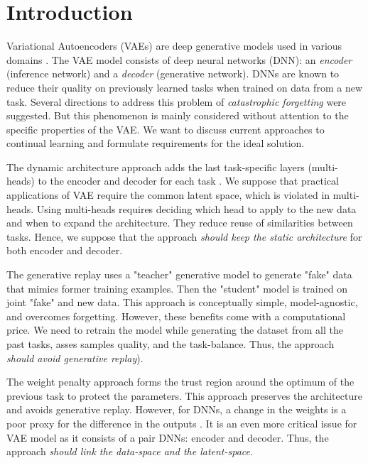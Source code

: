 \newpage
\section{Introduction}
\label{intro}
Variational Autoencoders (VAEs) \citep{kingma2014autoencoding} are deep generative models used in various domains \citep{lee2017augmented, zhou2020unsupervised}. The VAE model consists of deep neural networks (DNN): an \textit{encoder} (inference network) and a \textit{decoder} (generative network). DNNs are known to reduce their quality on previously learned tasks when trained on data from a new task. Several directions to address this problem of \textit{catastrophic forgetting} were suggested. But this phenomenon is mainly considered without attention to the specific properties of the VAE. We want to discuss current approaches to continual learning and formulate requirements for the ideal solution. 

The dynamic architecture approach adds the last task-specific layers (multi-heads) to the encoder and decoder for each task \citep{rusu2016progressive, nguyen2017variational, li2018learning}. We suppose that practical applications of VAE require the common latent space, which is violated in multi-heads. Using multi-heads requires deciding which head to apply to the new data and when to expand the architecture. They reduce reuse of similarities between tasks. Hence, we suppose that the approach \textit{should keep the static architecture} for both encoder and decoder.

The generative replay \citep{shin2017continual, rao2019continual} uses a "teacher" generative model to generate "fake" data that mimics former training examples. Then the "student" model is trained on joint "fake" and new data. This approach is conceptually simple, model-agnostic, and overcomes forgetting. However, these benefits come with a computational price. We need to retrain the model while generating the dataset from all the past tasks, asses samples quality, and the task-balance. Thus, the approach \textit{ should avoid generative replay}).

The weight penalty approach \citep{liu2018rotate, kirkpatrick2017overcoming} forms the trust region around the optimum of the previous task to protect the parameters. This approach preserves the architecture and avoids generative replay. However, for DNNs, a change in the weights is a poor proxy for the difference in the outputs \citep{benjamin2018measuring}. It is an even more critical issue for VAE model as it consists of a pair DNNs: encoder and decoder.  Thus, the approach \textit{should link the data-space and the latent-space}.


